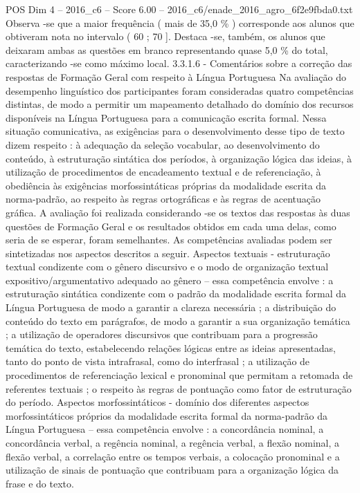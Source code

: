 \begin{textsample}{POS Dim 4 – 2016\_c6 – Score 6.00 – 2016\_c6/enade\_2016\_agro\_6f2e9fbda0.txt}
Observa -se que a maior frequência ( mais de 35,0 \% ) corresponde aos alunos que obtiveram nota no intervalo ( 60 ; 70 ].
Destaca -se, também, os alunos que deixaram ambas as questões em branco representando quase 5,0 \% do total, caracterizando -se como máximo local. 3.3.1.6 - Comentários sobre a correção das respostas de Formação Geral com respeito à Língua Portuguesa Na avaliação do desempenho linguístico dos participantes foram consideradas quatro competências distintas, de modo a permitir um mapeamento detalhado do domínio dos recursos disponíveis na Língua Portuguesa para a comunicação escrita formal.
Nessa situação comunicativa, as exigências para o desenvolvimento desse tipo de texto dizem respeito : à adequação da seleção vocabular, ao desenvolvimento do conteúdo, à estruturação sintática dos períodos, à organização lógica das ideias, à utilização de procedimentos de encadeamento textual e de referenciação, à obediência às exigências morfossintáticas próprias da modalidade escrita da norma-padrão, ao respeito às regras ortográficas e às regras de acentuação gráfica.
A avaliação foi realizada considerando -se os textos das respostas às duas questões de Formação Geral e os resultados obtidos em cada uma delas, como seria de se esperar, foram semelhantes.
As competências avaliadas podem ser sintetizadas nos aspectos descritos a seguir.
Aspectos textuais - estruturação textual condizente com o gênero discursivo e o modo de organização textual expositivo/argumentativo adequado ao gênero – essa competência envolve : a estruturação sintática condizente com o padrão da modalidade escrita formal da Língua Portuguesa de modo a garantir a clareza necessária ; a distribuição do conteúdo do texto em parágrafos, de modo a garantir a sua organização temática ; a utilização de operadores discursivos que contribuam para a progressão temática do texto, estabelecendo relações lógicas entre as ideias apresentadas, tanto do ponto de vista intrafrasal, como do interfrasal ; a utilização de procedimentos de referenciação lexical e pronominal que permitam a retomada de referentes textuais ; o respeito às regras de pontuação como fator de estruturação do período.
Aspectos morfossintáticos - domínio dos diferentes aspectos morfossintáticos próprios da modalidade escrita formal da norma-padrão da Língua Portuguesa – essa competência envolve : a concordância nominal, a concordância verbal, a regência nominal, a regência verbal, a flexão nominal, a flexão verbal, a correlação entre os tempos verbais, a colocação pronominal e a utilização de sinais de pontuação que contribuam para a organização lógica da frase e do texto.

\end{textsample}
